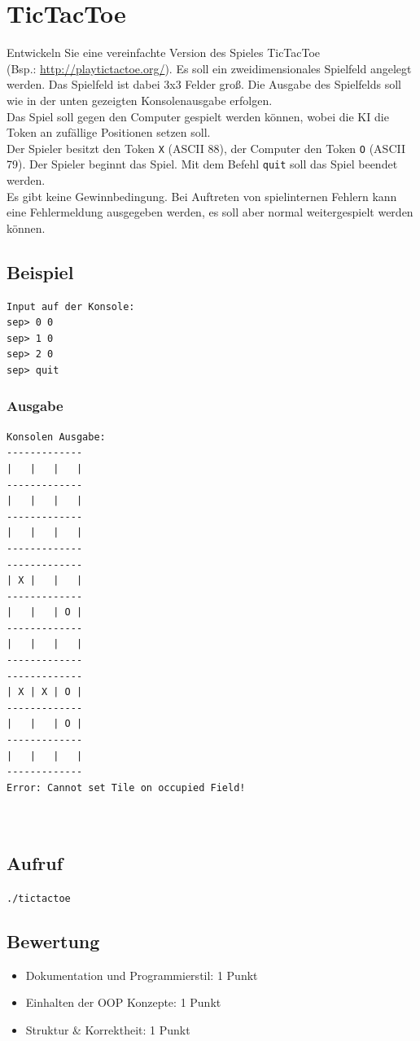 \documentclass[a4paper,10pt]{article}
\begin{document}
\section*{TicTacToe}

Entwickeln Sie eine vereinfachte Version des Spieles TicTacToe\\ (Bsp.: \url{http://playtictactoe.org/}).
Es soll ein zweidimensionales Spielfeld angelegt werden. Das Spielfeld ist dabei
3x3 Felder groß. Die Ausgabe des Spielfelds soll wie in der unten gezeigten Konsolenausgabe erfolgen.\\
Das Spiel soll gegen den Computer gespielt werden können, wobei die KI die Token an zufällige Positionen setzen soll.\\
Der Spieler besitzt den Token \texttt{X} (ASCII 88), der Computer den Token \texttt{O} (ASCII 79).
Der Spieler beginnt das Spiel.
Mit dem Befehl \texttt{quit} soll das Spiel beendet werden.\\
Es gibt keine Gewinnbedingung. Bei Auftreten von spielinternen Fehlern kann eine Fehlermeldung ausgegeben werden,
es soll aber normal weitergespielt werden können.

\begin{multicols}{2}

\subsection*{Beispiel}
\begin{verbatim}
Input auf der Konsole: 
sep> 0 0
sep> 1 0
sep> 2 0
sep> quit
\end{verbatim}

\subsubsection*{Ausgabe}

\begin{verbatim}
Konsolen Ausgabe:
-------------
|   |   |   |
-------------
|   |   |   |
-------------
|   |   |   |
-------------
-------------
| X |   |   |
-------------
|   |   | O |
-------------
|   |   |   |
-------------
-------------
| X | X | O |
-------------
|   |   | O |
-------------
|   |   |   |
-------------
Error: Cannot set Tile on occupied Field!



\end{verbatim}

\end{multicols}


\subsection*{Aufruf}
\texttt{./tictactoe}

\subsection*{Bewertung}
\begin{itemize}
 \item Dokumentation und Programmierstil: 1 Punkt
 \item Einhalten der OOP Konzepte: 1 Punkt
 \item Struktur \& Korrektheit: 1 Punkt
\end{itemize}

\newpage
\end{document}

